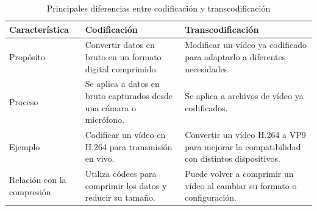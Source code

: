 \begin{table}[h]
    \centering
    \renewcommand{\arraystretch}{1.3} 
    \begin{tabular}{|>{\centering\arraybackslash}m{3.5cm} | 
                    >{\centering\arraybackslash}m{5.5cm} | 
                    >{\centering\arraybackslash}m{5.5cm} |}
        \hline
        \textbf{Característica} & \textbf{Codificación} & \textbf{Transcodificación} \\
        \hline
        Propósito & Convertir datos en bruto en un formato digital comprimido. & Modificar un vídeo ya codificado para adaptarlo a diferentes necesidades. \\
        \hline
        Proceso & Se aplica a datos en bruto capturados desde una cámara o micrófono. & Se aplica a archivos de vídeo ya codificados. \\
        \hline
        Ejemplo & Codificar un vídeo en H.264 para transmisión en vivo. & Convertir un vídeo H.264 a VP9 para mejorar la compatibilidad con distintos dispositivos. \\
        \hline
        Relación con la compresión & Utiliza códecs para comprimir los datos y reducir su tamaño. & Puede volver a comprimir un vídeo al cambiar su formato o configuración. \\
        \hline
    \end{tabular}
    \caption{Principales diferencias entre codificación y transcodificación}
    \label{tab:cod_vs_trans}
\end{table}
